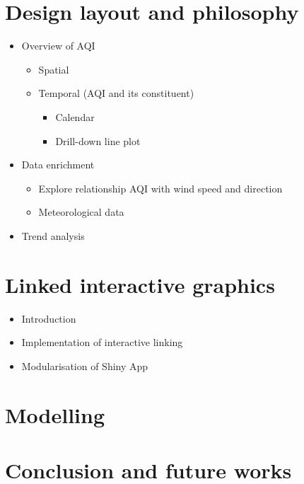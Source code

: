 \documentclass{aucklandthesis}
\begin{document}
\hypertarget{ch:design}{%
\chapter{Design layout and philosophy}\label{ch:design}}

\begin{itemize}
\tightlist
\item
  Overview of AQI

  \begin{itemize}
  \tightlist
  \item
    Spatial
  \item
    Temporal (AQI and its constituent)

    \begin{itemize}
    \tightlist
    \item
      Calendar
    \item
      Drill-down line plot
    \end{itemize}
  \end{itemize}
\item
  Data enrichment

  \begin{itemize}
  \tightlist
  \item
    Explore relationship AQI with wind speed and direction
  \item
    Meteorological data
  \end{itemize}
\item
  Trend analysis
\end{itemize}

\hypertarget{ch:linking}{%
\chapter{Linked interactive graphics}\label{ch:linking}}

\begin{itemize}
\tightlist
\item
  Introduction
\item
  Implementation of interactive linking
\item
  Modularisation of Shiny App
\end{itemize}

\hypertarget{ch:model}{%
\chapter{Modelling}\label{ch:model}}

\hypertarget{ch:conclusion}{%
\chapter{Conclusion and future works}\label{ch:conclusion}}
\end{document}
